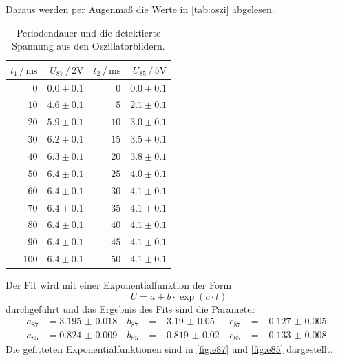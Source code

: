 Daraus werden per Augenmaß die Werte in \autoref{tab:oszi} abgelesen.
\begin{table}
    \centering
    \caption{Periodendauer und die detektierte Spannung aus den Oszillatorbildern.}
    \label{tab:oszi}
    \begin{tabular}{r r r r}
        \toprule
        $t_1 \,/\, \unit{\milli\second}$ & $U_\text{87} \,/\, 2 \unit{\volt}$ & $t_2 \,/\, \unit{\milli\second}$  & $U_\text{85} \,/\, 5 \unit{\volt}$\\
        \midrule
        $0$   & $0.0\pm 0.1$ & $0$   & $0.0\pm 0.1$\\
        $10$  & $4.6\pm 0.1$ & $5$   & $2.1\pm 0.1$\\
        $20$  & $5.9\pm 0.1$ & $10$  & $3.0\pm 0.1$\\
        $30$  & $6.2\pm 0.1$ & $15$  & $3.5\pm 0.1$\\
        $40$  & $6.3\pm 0.1$ & $20$  & $3.8\pm 0.1$\\
        $50$  & $6.4\pm 0.1$ & $25$  & $4.0\pm 0.1$\\
        $60$  & $6.4\pm 0.1$ & $30$  & $4.1\pm 0.1$\\
        $70$  & $6.4\pm 0.1$ & $35$  & $4.1\pm 0.1$\\
        $80$  & $6.4\pm 0.1$ & $40$  & $4.1\pm 0.1$\\
        $90$  & $6.4\pm 0.1$ & $45$  & $4.1\pm 0.1$\\
        $100$ & $6.4\pm 0.1$ & $50$  & $4.1\pm 0.1$\\
        \bottomrule
    \end{tabular}
\end{table}
Der Fit wird mit einer Exponentialfunktion der Form
\begin{equation*}
    U = a + b \cdot \exp(c \cdot t)
\end{equation*}
durchgeführt und das Ergebnis des Fits sind die Parameter 
\begin{align*}
    a_\text{87} &= \qty{3.195(18)}{} & b_{87} &= \qty{-3.19(5)}{} &  c_{87} &= \qty{-0.127(5)}{}\\
    a_\text{85} &= \qty{0.824(9)}{} & b_{85} &= \qty{-0.819(20)}{} &  c_{85} &= \qty{-0.133(8)}{}.
\end{align*}
Die gefitteten Exponentialfunktionen sind in \autoref{fig:e87} und \autoref{fig:e85} dargestellt.
